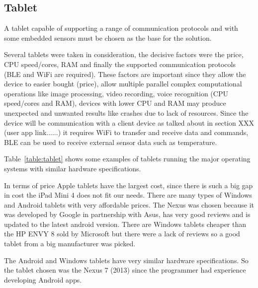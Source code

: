 \subsection{Tablet}

A tablet capable of supporting a range of communication protocols and with some embedded sensors must be chosen as the base for the solution.

Several tablets were taken in consideration, the decisive factors were the price, \ac{CPU} speed/cores, \ac{RAM} and finally the supported communication protocols (\ac{BLE} and \ac{WiFi} are required). These factors are important since they allow the device to easier bought (price), allow multiple parallel complex computational operations like image processing, video recording, voice recognition (\ac{CPU} speed/cores and \ac{RAM}), devices with lower \ac{CPU} and \ac{RAM} may produce unexpected and unwanted results like crashes due to lack of resources. Since the device will be communication with a client device as talked about in section XXX (user app link......) it requires \ac{WiFi} to transfer and receive data and commands, \ac{BLE} can be used to receive external sensor data such as temperature.


Table~\ref{table:tablet} shows some examples of tablets running the major operating systems with similar hardware specifications.

In terms of price Apple tablets have the largest cost, since there is such a big gap in cost the iPad Mini 4 does not fit our needs. There are many types of Windows and Android tablets with very affordable prices. The Nexus was chosen because it was developed by Google in partnership with Asus, has very good reviews and is updated to the latest android version. There are Windows tablets cheaper than the HP ENVY 8 sold by Microsoft but there were a lack of reviews so a good tablet from a big manufacturer was picked.

The Android and Windows tablets have very similar hardware specifications. So the tablet chosen was the Nexus 7 (2013) since the programmer had experience developing Android apps.


